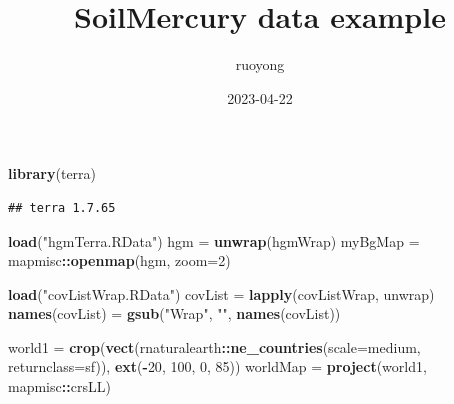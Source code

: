 \documentclass[
]{article}
\title{SoilMercury data example}
\author{ruoyong}
\date{2023-04-22}
\newenvironment{Shaded}{\begin{snugshade}}{\end{snugshade}}
\newcommand{\AttributeTok}[1]{\textcolor[rgb]{0.13,0.29,0.53}{#1}}
\newcommand{\DecValTok}[1]{\textcolor[rgb]{0.00,0.00,0.81}{#1}}
\newcommand{\FunctionTok}[1]{\textcolor[rgb]{0.13,0.29,0.53}{\textbf{#1}}}
\newcommand{\NormalTok}[1]{#1}
\newcommand{\OtherTok}[1]{\textcolor[rgb]{0.56,0.35,0.01}{#1}}
\newcommand{\SpecialCharTok}[1]{\textcolor[rgb]{0.81,0.36,0.00}{\textbf{#1}}}
\newcommand{\StringTok}[1]{\textcolor[rgb]{0.31,0.60,0.02}{#1}}
\begin{document}
\maketitle

\begin{Shaded}
\begin{Highlighting}[]
\FunctionTok{library}\NormalTok{(}\StringTok{\textquotesingle{}terra\textquotesingle{}}\NormalTok{)}
\end{Highlighting}
\end{Shaded}

\begin{verbatim}
## terra 1.7.65
\end{verbatim}

\begin{Shaded}
\begin{Highlighting}[]
\FunctionTok{load}\NormalTok{(}\StringTok{"hgmTerra.RData"}\NormalTok{)}
\NormalTok{hgm }\OtherTok{=} \FunctionTok{unwrap}\NormalTok{(hgmWrap)}
\NormalTok{myBgMap }\OtherTok{=}\NormalTok{ mapmisc}\SpecialCharTok{::}\FunctionTok{openmap}\NormalTok{(hgm, }\AttributeTok{zoom=}\DecValTok{2}\NormalTok{)}


\FunctionTok{load}\NormalTok{(}\StringTok{"covListWrap.RData"}\NormalTok{)}
\NormalTok{covList }\OtherTok{=} \FunctionTok{lapply}\NormalTok{(covListWrap, unwrap)}
\FunctionTok{names}\NormalTok{(covList) }\OtherTok{=} \FunctionTok{gsub}\NormalTok{(}\StringTok{"Wrap"}\NormalTok{, }\StringTok{""}\NormalTok{, }\FunctionTok{names}\NormalTok{(covList))}


\NormalTok{world1 }\OtherTok{=} \FunctionTok{crop}\NormalTok{(}\FunctionTok{vect}\NormalTok{(rnaturalearth}\SpecialCharTok{::}\FunctionTok{ne\_countries}\NormalTok{(}\AttributeTok{scale=}\StringTok{\textquotesingle{}medium\textquotesingle{}}\NormalTok{, }\AttributeTok{returnclass=}\StringTok{\textquotesingle{}sf\textquotesingle{}}\NormalTok{)),}
              \FunctionTok{ext}\NormalTok{(}\SpecialCharTok{{-}}\DecValTok{20}\NormalTok{, }\DecValTok{100}\NormalTok{, }\DecValTok{0}\NormalTok{, }\DecValTok{85}\NormalTok{))}
\NormalTok{worldMap }\OtherTok{=} \FunctionTok{project}\NormalTok{(world1, mapmisc}\SpecialCharTok{::}\NormalTok{crsLL)}
\end{Highlighting}
\end{Shaded}
\end{document}
